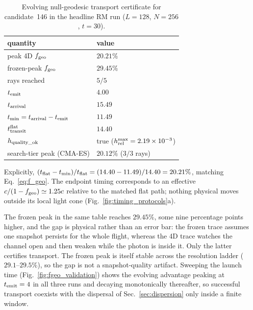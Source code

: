 \documentclass[twocolumn,floatfix,aps,prd,nofootinbib]{revtex4-2}
\begin{document}
\begin{table}[tbp]
\caption{Evolving null-geodesic transport certificate for candidate~146 in
the headline RM run ($L=128$, $N=256$, $t=30$).}
\label{tab:certificate}
\begin{ruledtabular}
\begin{tabular}{ll}
quantity & value \\
\hline
peak 4D $f_{\rm geo}$ & $20.21\%$ \\
frozen-peak $f_{\rm geo}$ & $29.45\%$ \\
rays reached & $5/5$ \\
$t_{\rm emit}$ & $4.00$ \\
$t_{\rm arrival}$ & $15.49$ \\
$t_{\rm min}=t_{\rm arrival}-t_{\rm emit}$ & $11.49$ \\
$t_{\rm transit}^{\rm flat}$ & $14.40$ \\
$h_{\rm quality\_ok}$ & true
($h_{\rm rel}^{\rm max}=2.19\times10^{-3}$) \\
search-tier peak (CMA-ES) & $20.12\%$ ($3/3$ rays) \\
\end{tabular}
\end{ruledtabular}
\end{table}

Explicitly,
$(t_{\rm flat}-t_{\rm min})/t_{\rm flat}
=(14.40-11.49)/14.40=20.21\%$, matching
Eq.~\eqref{eq:f_geo}. The endpoint timing corresponds to an effective
$c/(1-f_{\rm geo})\simeq1.25c$ relative to the matched flat path; nothing
physical moves outside its local light cone
(Fig.~\ref{fig:timing_protocols}a).

The frozen peak in the same table reaches $29.45\%$, some nine percentage
points higher, and the gap is physical rather than an error bar: the frozen
trace assumes one snapshot persists for the whole flight, whereas the 4D trace
watches the channel open and then weaken while the photon is inside it. Only
the latter certifies transport. The frozen peak is itself stable across the
resolution ladder ($29.1$--$29.5\%$), so the gap is not a snapshot-quality
artifact. Sweeping the launch time (Fig.~\ref{fig:fgeo_validation}) shows the
evolving advantage peaking at $t_{\rm emit}=4$ in all three runs and decaying
monotonically thereafter, so successful transport coexists with the dispersal
of Sec.~\ref{sec:dispersion} only inside a finite window.
\end{document}
